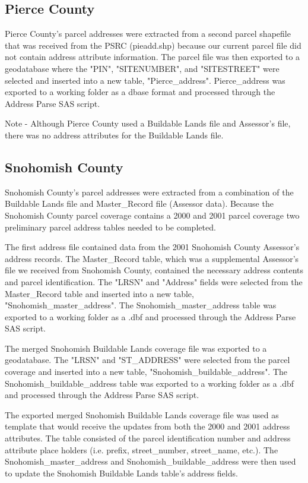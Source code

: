 \subsection{Pierce County}

Pierce County's parcel addresses were extracted from a second
parcel shapefile that was received from the PSRC (pieadd.shp)
because our current parcel file did not contain address attribute
information. The parcel file was then exported to a geodatabase
where the "PIN", "SITENUMBER", and "SITESTREET" were selected and
inserted into a new table, "Pierce_address". Pierce_address was
exported to a working folder as a dbase format and processed
through the Address Parse SAS script.

Note - Although Pierce County used a Buildable Lands file and
Assessor's file, there was no address attributes for the Buildable
Lands file.

\subsection{Snohomish County}

Snohomish County's parcel addresses were extracted from a
combination of the Buildable Lands file and Master_Record file
(Assessor data). Because the Snohomish County parcel coverage
contains a 2000 and 2001 parcel coverage two preliminary parcel
address tables needed to be completed.

The first address file contained data from the 2001 Snohomish
County Assessor's address records. The Master_Record table, which
was a supplemental Assessor's file we received from Snohomish
County, contained the necessary address contents and parcel
identification. The "LRSN" and "Address" fields were selected from
the Master_Record table and inserted into a new table,
"Snohomish_master_address". The Snohomish_master_address table was
exported to a working folder as a .dbf and processed through the
Address Parse SAS script.

The merged Snohomish Buildable Lands coverage file was exported to
a geodatabase. The "LRSN" and "ST_ADDRESS" were selected from the
parcel coverage and inserted into a new table,
"Snohomish_buildable_address". The Snohomish_buildable_address
table was exported to a working folder as a .dbf and processed
through the Address Parse SAS script.

The exported merged Snohomish Buildable Lands coverage file was
used as template that would receive the updates from both the 2000
and 2001 address attributes. The table consisted of the parcel
identification number and address attribute place holders (i.e.
prefix, street_number, street_name, etc.). The
Snohomish_master_address and Snohomish_buildable_address were then
used to update the Snohomish Buildable Lands table's address
fields.

